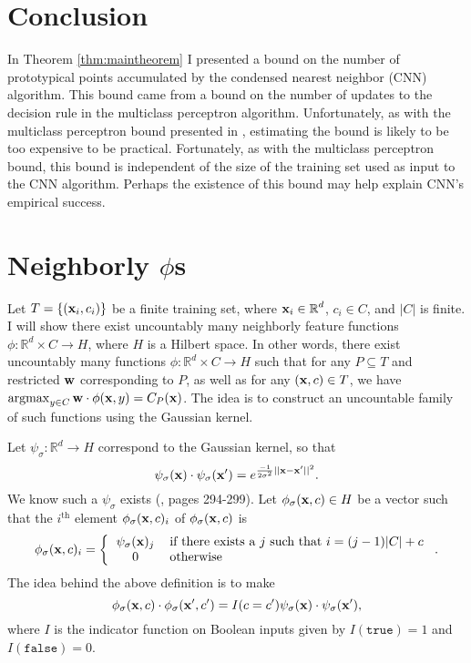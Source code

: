 \documentclass[preprint]{elsarticle}
\newcommand{\R}{ \mbox{${\mathbb R}$}}
\newcommand{\argmax}{\operatornamewithlimits{argmax}}
\begin{document}
\section{Conclusion}
In Theorem \ref{thm:maintheorem} I presented a bound on the number of prototypical points accumulated by the condensed nearest neighbor (CNN) algorithm. This bound came from a bound on the number of updates to the decision rule in the multiclass perceptron algorithm. Unfortunately, as with the multiclass perceptron bound presented in \cite{CollinsPerceptron}, estimating the bound is likely to be too expensive to be practical. Fortunately, as with the multiclass perceptron bound, this bound is independent of the size of the training set used as input to the CNN algorithm. Perhaps the existence of this bound may help explain CNN's empirical success.

\appendix

\section{Neighborly $\phi$s}
\label{sec:appdx}
Let $T = \{ ({\bf x}_i,c_i) \}$ be a finite training set, where ${\bf x}_i \in \R^d$, $c_i \in C$, and $|C|$ is finite. I will show there exist uncountably many neighborly feature functions $\phi : \R^d \times C \rightarrow H$, where $H$ is a Hilbert space. In other words, there exist uncountably many functions $\phi : \R^d \times C \rightarrow H$ such that for any $P \subseteq T$ and restricted ${\bf w}$ corresponding to $P$, as well as for any $({\bf x},c) \in T$, we have $\argmax_{y \in C} {\bf w} \cdot \phi({\bf x},y) = C_P({\bf x})$. The idea is to construct an uncountable family of such functions using the Gaussian kernel.

Let $\psi_\sigma:\R^d \rightarrow H$ correspond to the Gaussian kernel, so that 
\[
\psi_\sigma({\bf x}) \cdot \psi_\sigma({\bf x}') = e^{\frac{-1}{2 \sigma^2} ||{\bf x} - {\bf x}'||^2}.
\] 
We know such a $\psi_\sigma$ exists (\cite{bishop-2006}, pages 294-299). Let $\phi_\sigma({\bf x},c) \in H$ be a vector such that the $i^{\text{th}}$ element $\phi_\sigma({\bf x},c)_i$ of $\phi_\sigma({\bf x},c)$ is
\[
\phi_\sigma({\bf x},c)_i = 
\left\{ \begin{tabular}{ c l}
  $\psi_\sigma({\bf x})_j$ & if there exists a $j$ such that $i = (j-1)|C| + c$  \\
  $0$ & otherwise  \\
\end{tabular}\right..
\]
The idea behind the above definition is to make
\[
\phi_\sigma({\bf x},c)  \cdot \phi_\sigma({\bf x}',c') = I(c = c') \psi_\sigma({\bf x}) \cdot \psi_\sigma({\bf x}'),
\]
where $I$ is the indicator function on Boolean inputs given by $I(\texttt{true})=1$ and $I({\texttt{false}}) = 0$.
\end{document}
